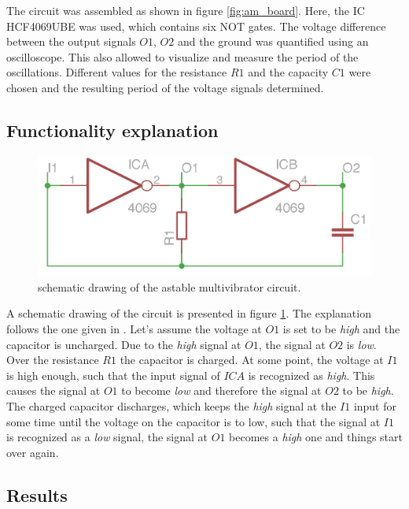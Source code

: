 \documentclass[journal]{IEEEtran}
\begin{document}
The circuit was assembled as shown in figure \ref{fig:am_board}. Here, the IC
HCF4069UBE was used, which contains six NOT gates. The voltage difference
between the output signals $O1$, $O2$ and the ground was quantified using an
oscilloscope. This also allowed to visualize and measure the period of the
oscillations.
Different values for the resistance $R1$ and the capacity $C1$ were chosen and
the resulting period of the voltage signals determined.

\subsection{Functionality explanation}

\begin{figure}[h!]
  \centering
   \includegraphics[]{boards/am_overview.png}
   \caption{schematic drawing of the astable multivibrator circuit.}
   \label{fig:am_scheme}
\end{figure}

A schematic drawing of the circuit is presented in figure \ref{fig:am_scheme}.
The explanation follows the one given in \cite{book_dg}. Let's assume the
voltage at $O1$ is set to be \emph{high} and the capacitor is uncharged. Due to
the \emph{high} signal at $O1$, the signal at $O2$ is \emph{low}. Over the
resistance $R1$ the capacitor is charged. At some point, the voltage at $I1$ is high enough, such
that the input signal of $ICA$ is recognized as \emph{high}. This causes the
signal at $O1$ to become \emph{low} and therefore the signal at $O2$ to be
\emph{high}. The charged capacitor discharges, which keeps the \emph{high}
signal at the $I1$ input for some time until the voltage on the capacitor is to
low, such that the signal at $I1$ is recognized as a \emph{low} signal, the
signal at $O1$ becomes a \emph{high} one and things start over again.

\subsection{Results}
\end{document}
